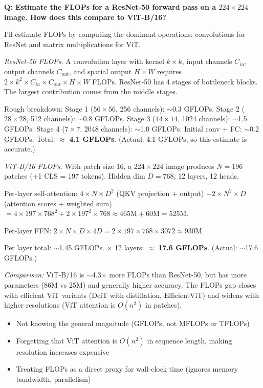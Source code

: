 \begin{interviewq}
\textbf{Q: Estimate the FLOPs for a ResNet-50 forward pass on a $224 \times 224$ image. How does this compare to ViT-B/16?}

 \quad {} \quad \badgefreq{\freqmed}

\stronganswer I'll estimate FLOPs by computing the dominant operations: convolutions for ResNet and matrix multiplications for ViT.

\textit{ResNet-50 FLOPs.} A convolution layer with kernel $k \times k$, input channels $C_{in}$, output channels $C_{out}$, and spatial output $H \times W$ requires $2 \times k^2 \times C_{in} \times C_{out} \times H \times W$ FLOPs. ResNet-50 has 4 stages of bottleneck blocks. The largest contribution comes from the middle stages.

Rough breakdown: Stage 1 ($56 \times 56$, 256 channels): $\sim$0.3 GFLOPs. Stage 2 ($28 \times 28$, 512 channels): $\sim$0.8 GFLOPs. Stage 3 ($14 \times 14$, 1024 channels): $\sim$1.5 GFLOPs. Stage 4 ($7 \times 7$, 2048 channels): $\sim$1.0 GFLOPs. Initial conv + FC: $\sim$0.2 GFLOPs. Total: $\approx$ \textbf{4.1 GFLOPs}. (Actual: 4.1 GFLOPs, so this estimate is accurate.)

\textit{ViT-B/16 FLOPs.} With patch size 16, a $224 \times 224$ image produces $N = 196$ patches (+1 CLS = 197 tokens). Hidden dim $D = 768$, 12 layers, 12 heads.

Per-layer self-attention: $4 \times N \times D^2$ (QKV projection + output) $+ 2 \times N^2 \times D$ (attention scores + weighted sum) $= 4 \times 197 \times 768^2 + 2 \times 197^2 \times 768 \approx 465\text{M} + 60\text{M} = 525\text{M}$.

Per-layer FFN: $2 \times N \times D \times 4D = 2 \times 197 \times 768 \times 3072 \approx 930\text{M}$.

Per layer total: $\sim$1.45 GFLOPs. $\times$ 12 layers: $\approx$ \textbf{17.6 GFLOPs}. (Actual: $\sim$17.6 GFLOPs.)

\textit{Comparison:} ViT-B/16 is $\sim$4.3$\times$ more FLOPs than ResNet-50, but has more parameters (86M vs 25M) and generally higher accuracy. The FLOPs gap closes with efficient ViT variants (DeiT with distillation, EfficientViT) and widens with higher resolutions (ViT attention is $O(n^2)$ in patches).

\redflags
\begin{itemize}
    \item Not knowing the general magnitude (GFLOPs, not MFLOPs or TFLOPs)
    \item Forgetting that ViT attention is $O(n^2)$ in sequence length, making resolution increases expensive
    \item Treating FLOPs as a direct proxy for wall-clock time (ignores memory bandwidth, parallelism)
\end{itemize}


\end{interviewq}
